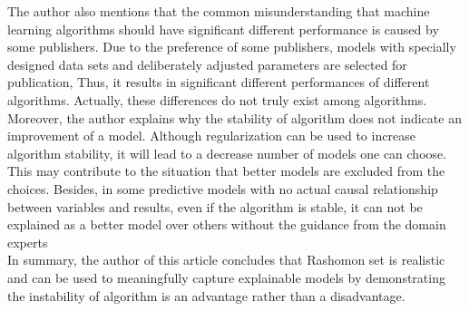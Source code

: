 \documentclass[12pt]{article}
\begin{document}
The author also mentions that the common misunderstanding that machine learning algorithms should have significant different performance is caused by some publishers. Due to the preference of some publishers, models with specially designed data sets and deliberately adjusted parameters are selected for publication, Thus, it results in significant different performances of different algorithms. Actually, these differences do not truly exist among algorithms. 
~\\

Moreover, the author explains why the stability of algorithm does not indicate an improvement of a model. Although regularization can be used to increase algorithm stability, it will lead to a decrease number of models one can choose. This may contribute to the situation that better models are excluded from the choices. Besides, in some predictive models with no actual causal relationship between variables and results, even if the algorithm is stable, it can not be explained as a better model over others without the guidance from the domain experts
~\\

In summary, the author of this article concludes that Rashomon set is realistic and can be used to meaningfully capture explainable models by demonstrating the instability of algorithm is an advantage rather than a disadvantage.
\end{document}
